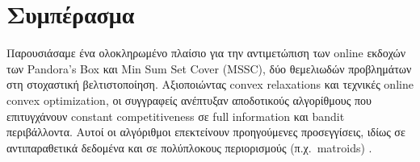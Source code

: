 \documentclass[11pt,a4paper]{article}
\begin{document}
\section{Συμπέρασμα}
Παρουσιάσαμε ένα ολοκληρωμένο πλαίσιο για την αντιμετώπιση των online εκδοχών των Pandora’s Box και Min Sum Set Cover (MSSC), δύο θεμελιωδών προβλημάτων στη στοχαστική βελτιστοποίηση. Αξιοποιώντας convex relaxations και τεχνικές online convex optimization, οι συγγραφείς ανέπτυξαν αποδοτικούς αλγορίθμους που επιτυγχάνουν constant competitiveness σε full information και bandit περιβάλλοντα. Αυτοί οι αλγόριθμοι επεκτείνουν προηγούμενες προσεγγίσεις, ιδίως σε αντιπαραθετικά δεδομένα και σε πολύπλοκους περιορισμούς (π.χ.\ matroids) \cite{gergatsouli2022online}.



\end{document}
